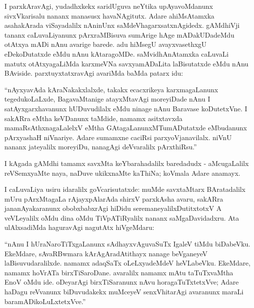 I parxkAravAgi, yudadhxkekx saridUguva neYtika upAyavoMdanunx sivxVkarisalu nananx manasusx havaNAgitutx. Adare ahiMsAtamxka asahakArada viSayadalilx nAninUnx saMdeVhagarxsatxnAgidedx. gAMdhiVji tananx caLuvaLiyanunx pArxraMBisuva sumArige hAge mADakUDadeMdu otAtxya mADi nAnu avarige barede. adu hiMsegU avayxvasethxgU eDekoDutatxde eMdu nAnu kAtaragoMDe. saMvidhAnAtamxka caLuvaLi matutx otAtxyagaLiMda karxmeVNa savxyamADaLita laBisutatxde eMdu nAnu BAviside. parxtuyxtatxravAgi avariMda baMda patarx idu:

\begin{minipage}[c]{.5cm}
\quad 
\end{minipage}
\begin{minipage}[c]{8.5cm}
``nAyxyavAda kAraNakakxlalxde, takakx ecacxrikeya karxmagaLanunx tegedukoLaLxde, BagavaMtanige atayxMtavAgi moreyiDade nAnu I satAyxgarxhavanunx hUDuvudilalx eMdu ninage nAnu Baravase koDutetxVne. I sakARra eMtha keVDanunx taMdide, namamx asitxtavxda mamaRsAthxnagaLalelxV eMtha GAtagaLanunxMTumADutatxde eMbudanunx pArxyashaH niVnariye. Adare sumamxne caciRsi parxyoVjanavilalx. niVnU nananx jateyalilx moreyiDu, nanagAgi deVvaralilx pArxthiRsu.''
\end{minipage}

I kAgada gAMdhi tamamx savxMta keYbarahadalilx baredadudx - aMcugaLalilx reVSemxyaMte naya, naDuve ukikxnaMte kaThiNa; koVmala Adare anamayx.

I caLuvaLiya usiru idaralilx goVcarisutatxde: muMde savxtaMtarx BAratadalilx mUru pArxMtagaLa rAjayxpAlarAda shirxV parxkAsha avaru, sakARra jananAyakaranunx obobxbabxrAgi hiDidu seremaneyalilxDutitxtotxV A veVLeyalilx oMdu dina oMdu TiVpATiRyalilx nananx saMgaDavidadxru. Ata ulAlxsadiMda haguravAgi nagutAtx hiVgeMdaru:

\begin{minipage}[c]{.5cm}
\quad 
\end{minipage}
\begin{minipage}[c]{8.5cm}
``nAnu I hUraNaroTiTxgaLanunx sAdhayxvAguvaSuTx IgaleV tiMdu biDabeVku. EkeMdare, sAvaRBwmara kArAgAradAtithayx nanage beVganeyeV laBisuvudaralilxde. namamx adaqSaTx oLeLxyadeMdeV heVLabeVku. EkeMdare, namamx hoVrATa birxTiSaroDane. avaralilx namamx mAtu taTuTxvaMtha EnoV oMdu ide. oDeyarAgi birxTiSaranunx nAvu horagaTuTxtetxVve; Adare haDagu reVvanunx biDuvudakekx muMceyeV senxVhitarAgi avaranunx maraLi baramADikoLuLxtetxVve.''
\end{minipage}

